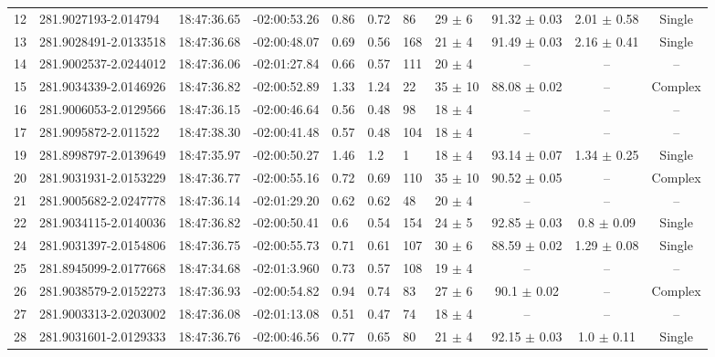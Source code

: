 \begin{table}[htp]
\begin{tabular}{llllllllccc}
12  &  281.9027193-2.014794  &  18:47:36.65  &  -02:00:53.26  &  0.86  &  0.72  &  86  &  29 $\pm$ 6  &  91.32 $\pm$ 0.03  &  2.01 $\pm$ 0.58  &  Single \\
13  &  281.9028491-2.0133518  &  18:47:36.68  &  -02:00:48.07  &  0.69  &  0.56  &  168  &  21 $\pm$ 4  &  91.49 $\pm$ 0.03  &  2.16 $\pm$ 0.41  &  Single \\
14  &  281.9002537-2.0244012  &  18:47:36.06  &  -02:01:27.84  &  0.66  &  0.57  &  111  &  20 $\pm$ 4  &  --  &  --  &  -- \\
15  &  281.9034339-2.0146926  &  18:47:36.82  &  -02:00:52.89  &  1.33  &  1.24  &  22  &  35 $\pm$ 10  &  88.08 $\pm$ 0.02  &  --  &  Complex \\
16  &  281.9006053-2.0129566  &  18:47:36.15  &  -02:00:46.64  &  0.56  &  0.48  &  98  &  18 $\pm$ 4  &  --  &  --  &  -- \\
17  &  281.9095872-2.011522  &  18:47:38.30  &  -02:00:41.48  &  0.57  &  0.48  &  104  &  18 $\pm$ 4  &  --  &  --  &  -- \\
19  &  281.8998797-2.0139649  &  18:47:35.97  &  -02:00:50.27  &  1.46  &  1.2  &  1  &  18 $\pm$ 4  &  93.14 $\pm$ 0.07  &  1.34 $\pm$ 0.25  &  Single \\
20  &  281.9031931-2.0153229  &  18:47:36.77  &  -02:00:55.16  &  0.72  &  0.69  &  110  &  35 $\pm$ 10  &  90.52 $\pm$ 0.05  &  --  &  Complex \\
21  &  281.9005682-2.0247778  &  18:47:36.14  &  -02:01:29.20  &  0.62  &  0.62  &  48  &  20 $\pm$ 4  &  --  &  --  &  -- \\
22  &  281.9034115-2.0140036  &  18:47:36.82  &  -02:00:50.41  &  0.6  &  0.54  &  154  &  24 $\pm$ 5  &  92.85 $\pm$ 0.03  &  0.8 $\pm$ 0.09  &  Single \\
24  &  281.9031397-2.0154806  &  18:47:36.75  &  -02:00:55.73  &  0.71  &  0.61  &  107  &  30 $\pm$ 6  &  88.59 $\pm$ 0.02  &  1.29 $\pm$ 0.08  &  Single \\
25  &  281.8945099-2.0177668  &  18:47:34.68  &  -02:01:3.960  &  0.73  &  0.57  &  108  &  19 $\pm$ 4  &  --  &  --  &  -- \\
26  &  281.9038579-2.0152273  &  18:47:36.93  &  -02:00:54.82  &  0.94  &  0.74  &  83  &  27 $\pm$ 6  &  90.1 $\pm$ 0.02  &  --  &  Complex \\
27  &  281.9003313-2.0203002  &  18:47:36.08  &  -02:01:13.08  &  0.51  &  0.47  &  74  &  18 $\pm$ 4  &  --  &  --  &  -- \\
28  &  281.9031601-2.0129333  &  18:47:36.76  &  -02:00:46.56  &  0.77  &  0.65  &  80  &  21 $\pm$ 4  &  92.15 $\pm$ 0.03  &  1.0 $\pm$ 0.11  &  Single \\

\end{tabular}
\end{table}
